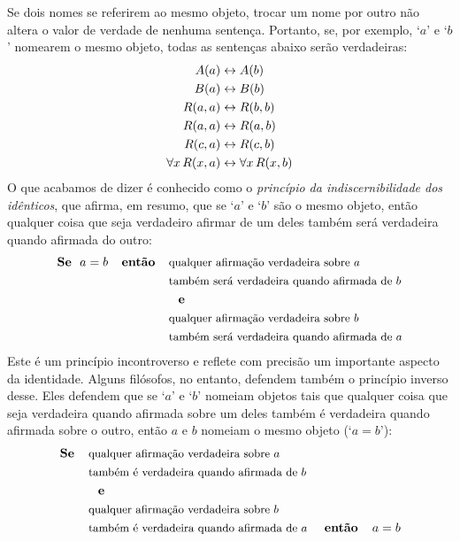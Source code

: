 Se dois nomes se referirem ao mesmo objeto, trocar um nome por outro não altera o valor de verdade de nenhuma sentença.
Portanto, se, por exemplo, `$a$' e `$b$' nomearem o mesmo objeto, todas as sentenças abaixo serão verdadeiras:\label{model.nonidentity}
	\begin{align*}
	 	\mathord{A}(a) &\leftrightarrow \mathord{A}(b) \\
	 	\mathord{B}(a) &\leftrightarrow \mathord{B}(b)\\
		\mathord{R}(a,a) &\leftrightarrow \mathord{R}(b,b)\\
		\mathord{R}(a,a) & \leftrightarrow \mathord{R}(a,b)\\
		\mathord{R}(c,a) &\leftrightarrow \mathord{R}(c,b)\\
		\forall x\, \mathord{R}(x,a) &\leftrightarrow \forall x\, \mathord{R}(x,b)
	\end{align*}
O que acabamos de dizer é conhecido como o \emph{princípio da indiscernibilidade dos idênticos}, que afirma, em resumo, que se `$a$' e `$b$' são o mesmo objeto, então qualquer coisa que seja verdadeiro afirmar de um deles também será verdadeira quando afirmada do outro:	
\begin{align*} 
	\text{\textbf{Se} \ $a=b$ \textbf{ \ então \ } }&\text{\small qualquer afirmação verdadeira sobre $a$}\\
	&\text{\small também será verdadeira quando afirmada de $b$}\\
	&\text{\textbf{ \ e}}\\
	&\text{\small qualquer afirmação verdadeira sobre $b$}\\
	&\text{\small também será verdadeira quando afirmada de $a$}
\end{align*}
Este é um princípio incontroverso e reflete com precisão um importante aspecto da identidade.
Alguns filósofos, no entanto, defendem também o princípio inverso desse.
Eles defendem que se `$a$' e `$b$' nomeiam objetos tais que qualquer coisa que seja verdadeira quando afirmada sobre um deles também é verdadeira quando afirmada sobre o outro, então $a$ e $b$ nomeiam o mesmo objeto (`$a=b$'):
\begin{align*} 
	\text{\textbf{Se \ \ }}&\text{\small qualquer afirmação verdadeira sobre $a$}&&\\
	&\text{\small também é verdadeira quando afirmada de $b$}&&\\
	&\text{\textbf{ \ e}}&&\\
	&\text{\small qualquer afirmação verdadeira sobre $b$}&&\\
	&\text{\small também é verdadeira quando afirmada de $a$}&\text{\textbf{ então \ \ }}&a=b
\end{align*}
